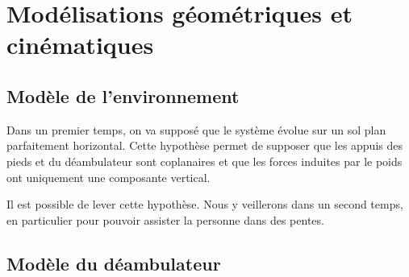\documentclass[a4paper, 10pt ]{article}
\begin{document}
\section{Modélisations géométriques et cinématiques}

\subsection{Modèle de l'environnement}

Dans un premier temps, on va supposé que le système évolue sur un sol plan parfaitement horizontal. Cette hypothèse permet de supposer que les appuis des pieds et du déambulateur sont coplanaires et que les forces induites par le poids ont uniquement une composante vertical. 

Il est possible de lever cette hypothèse. Nous y veillerons dans un second temps, en particulier pour pouvoir assister la personne dans des pentes.

\subsection{Modèle du déambulateur}

%
\end{document}
